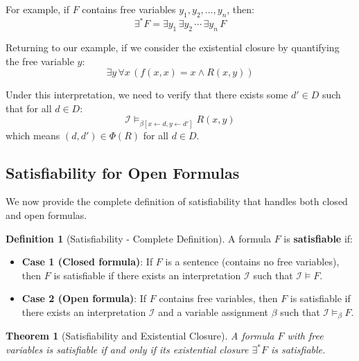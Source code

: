 \documentclass[11pt,a4paper]{article}
\theoremstyle{definition}
\newtheorem{definition}{Definition}[section]
\theoremstyle{plain}
\newtheorem{theorem}{Theorem}[section]
\theoremstyle{remark}
\begin{document}
For example, if $F$ contains free variables $y_1, y_2, \dots, y_n$, then:
\[
\exists^* F = \exists y_1 \, \exists y_2 \, \cdots \, \exists y_n \, F
\]

Returning to our example, if we consider the existential closure by quantifying the free variable $y$:
\[
\exists y \, \forall x \, (f(x, x) = x \wedge R(x, y))
\]

Under this interpretation, we need to verify that there exists some $d' \in D$ such that for all $d \in D$:
\[
\mathcal{I} \models_{\beta[x \leftarrow d, y \leftarrow d']} R(x, y)
\]
which means $(d, d') \in \Phi(R)$ for all $d \in D$.

\subsection{Satisfiability for Open Formulas}

We now provide the complete definition of satisfiability that handles both closed and open formulas.

\begin{tcolorbox}[colback=blue!5!white,colframe=blue!75!black,title=\textbf{Satisfiability - Complete Definition}]
\begin{definition}[Satisfiability - Complete Definition]
A formula $F$ is \textbf{satisfiable} if:
\begin{itemize}
    \item \textbf{Case 1 (Closed formula)}: If $F$ is a sentence (contains no free variables), then $F$ is satisfiable if there exists an interpretation $\mathcal{I}$ such that $\mathcal{I} \models F$.
    
    \item \textbf{Case 2 (Open formula)}: If $F$ contains free variables, then $F$ is satisfiable if there exists an interpretation $\mathcal{I}$ and a variable assignment $\beta$ such that $\mathcal{I} \models_\beta F$.
\end{itemize}
\end{definition}
\end{tcolorbox}

\begin{theorem}[Satisfiability and Existential Closure]
A formula $F$ with free variables is satisfiable if and only if its existential closure $\exists^* F$ is satisfiable.
\end{theorem}
\end{document}
